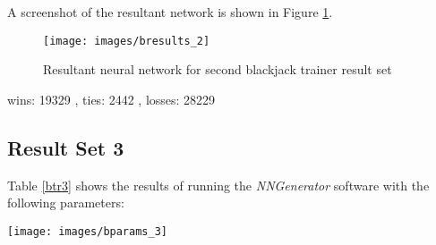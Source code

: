 A screenshot of the resultant network is shown in Figure \ref{bresults_2}.

\begin{figure}[h!]
  \centering
  \texttt{[image: images/bresults\_2]}
  \caption{Resultant neural network for second blackjack trainer result set}
  \label{bresults_2}
\end{figure}

wins:  19329 , ties:  2442 , losses:  28229

\subsection{Result Set 3}
Table \ref{btr3} shows the results of running the {\it NNGenerator} software with the following parameters:

\begin{center}
\texttt{[image: images/bparams\_3]}
\end{center}

